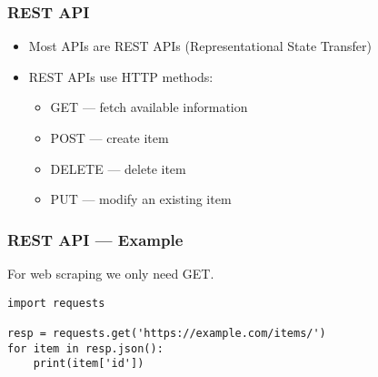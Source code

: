\begin{frame}
    \frametitle{REST API}
    \begin{itemize}
        \item Most APIs are REST APIs (Representational State Transfer)
        \item REST APIs use HTTP methods:
        \begin{itemize}
            \item GET --- fetch available information
            \item POST --- create item
            \item DELETE --- delete item
            \item PUT --- modify an existing item
        \end{itemize}
    \end{itemize}
\end{frame}

\begin{frame}[fragile]
    \frametitle{REST API --- Example}

    For web scraping we only need GET.

\begin{verbatim}
import requests

resp = requests.get('https://example.com/items/')
for item in resp.json():
    print(item['id'])
\end{verbatim}
\end{frame}